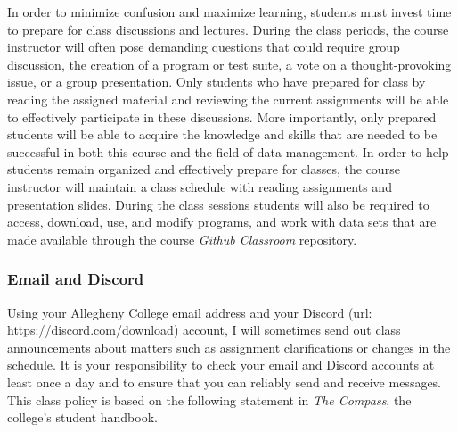 \documentclass[11pt]{article} %
\begin{document}
% 

\noindent In order to minimize confusion and maximize learning, students must invest time to prepare for class discussions and lectures.  During the class periods, the course instructor will often pose demanding questions that could require group discussion, the creation of a program or test suite, a vote on a thought-provoking issue, or a group presentation.  Only students who have prepared for class by reading the assigned material and reviewing the current assignments will be able to effectively participate in these discussions.  More importantly, only prepared students will be able to acquire the knowledge and skills that are needed to be successful in both this course and the field of data management.  In order to help students remain organized and effectively prepare for classes, the course instructor will maintain a class schedule with reading assignments and presentation slides.   During the class sessions students will also be required to access, download, use, and modify programs, and work with data sets that are made available through the course {\em Github Classroom} repository. %

\subsubsection*{\textbf{Email and Discord}}

Using your Allegheny College email address and your Discord (url: \url{https://discord.com/download}) account, I will sometimes send out class announcements about matters such as assignment clarifications or changes in the schedule. It is your responsibility to check your email and Discord accounts at least once a day and to ensure that you can reliably send and receive messages. This class policy is based on the following statement in {\em The Compass}, the college's student handbook.
\end{document}
